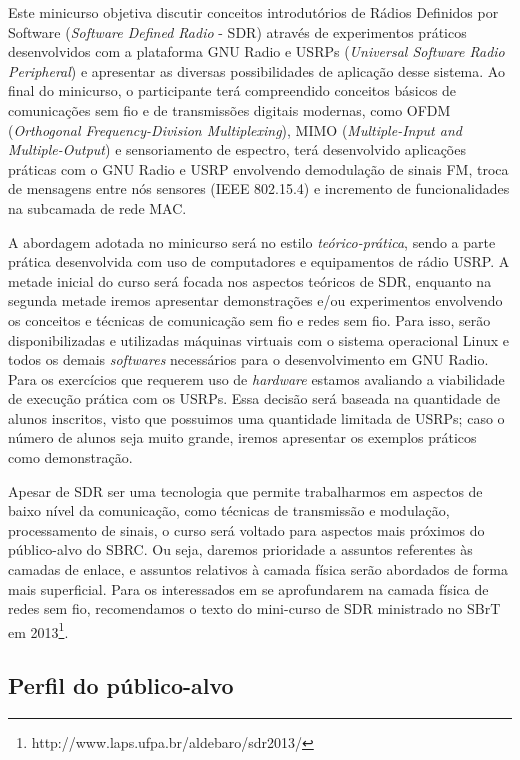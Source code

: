 \documentclass{SBCbookchapter}
\begin{document}
Este minicurso objetiva discutir conceitos introdutórios de Rádios Definidos por Software (\textit{Software Defined Radio} - SDR) através de experimentos práticos desenvolvidos com a plataforma GNU Radio e USRPs (\textit{Universal Software Radio Peripheral}) e apresentar as diversas possibilidades de aplicação desse sistema. Ao final do minicurso, o participante terá compreendido conceitos básicos de comunicações sem fio e de transmissões digitais modernas, como OFDM (\textit{Orthogonal Frequency-Division Multiplexing}), MIMO (\textit{Multiple-Input and Multiple-Output}) e sensoriamento de espectro, terá desenvolvido aplicações práticas com o GNU Radio e USRP envolvendo demodulação de sinais FM, troca de mensagens entre nós sensores (IEEE 802.15.4) e incremento de funcionalidades na subcamada de rede MAC.

A abordagem adotada no minicurso será no estilo \textit{teórico-prática},  sendo a parte prática desenvolvida com uso de computadores e equipamentos de rádio USRP. A metade inicial do curso será focada nos aspectos teóricos de SDR, enquanto na segunda metade iremos apresentar demonstrações e/ou experimentos envolvendo os conceitos e técnicas de comunicação sem fio e redes sem fio. Para isso, serão disponibilizadas e utilizadas máquinas virtuais com o sistema operacional Linux e todos os demais \textit{softwares} necessários para o desenvolvimento em GNU Radio.  Para os exercícios que requerem uso de \textit{hardware} estamos avaliando a viabilidade de execução prática com os USRPs. Essa decisão será baseada na quantidade de alunos inscritos, visto que possuimos uma quantidade limitada de USRPs; caso o número de alunos seja muito grande, iremos apresentar os exemplos práticos como demonstração.

Apesar de SDR ser uma tecnologia que permite trabalharmos em aspectos de baixo nível da comunicação, como técnicas de transmissão e modulação, processamento de sinais, o curso será voltado para aspectos mais próximos do público-alvo do SBRC. Ou seja, daremos prioridade a assuntos referentes às camadas de enlace, e assuntos relativos à camada física serão abordados de forma mais superficial. Para os interessados em se aprofundarem na camada física de redes sem fio, recomendamos o texto do mini-curso de SDR ministrado no SBrT em 2013\footnote{http://www.laps.ufpa.br/aldebaro/sdr2013/}.

\subsection{Perfil do público-alvo}
\end{document}
